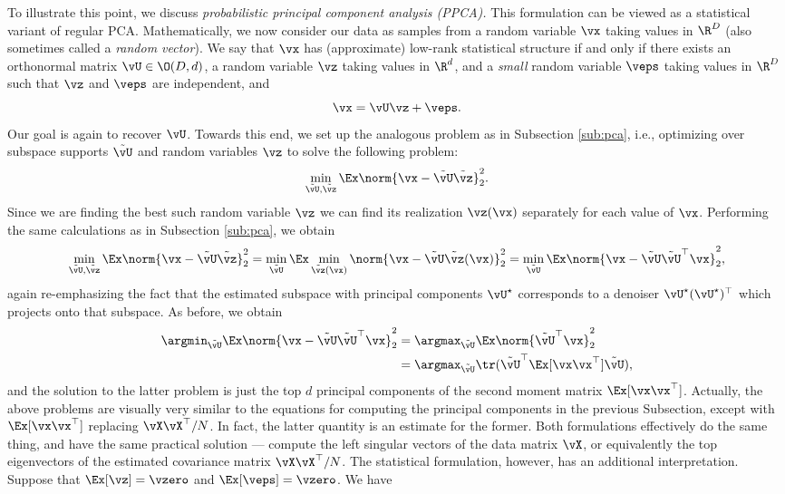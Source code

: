 \documentclass[../../book-main.tex]{subfiles}
\begin{document}
To illustrate this point, we discuss \textit{probabilistic principal component analysis (PPCA).} This formulation can be viewed as a statistical variant of regular PCA. Mathematically, we now consider our data as samples from a random variable \(\vx\) taking values in \(\R^{D}\) (also sometimes called a \textit{random vector}). We say that \(\vx\) has (approximate) low-rank statistical structure if and only if there exists an orthonormal matrix \(\vU \in \O(D, d)\), a random variable \(\vz\) taking values in \(\R^{d}\), and a \textit{small} random variable \(\veps\) taking values in \(\R^{D}\) such that \(\vz\) and \(\veps\) are independent, and
\begin{equation}
    \vx = \vU\vz + \veps.
\end{equation}
Our goal is again to recover \(\vU\). Towards this end, we set up the analogous problem as in Subsection \eqref{sub:pca}, i.e., optimizing over subspace supports \(\tilde{\vU}\) and random variables \(\vz\) to solve the following problem:
\begin{equation}
    \min_{\tilde{\vU}, \tilde{\vz}}\Ex\norm{\vx - \tilde{\vU}\tilde{\vz}}_{2}^{2}.
\end{equation}
Since we are finding the best such random variable \(\vz\) we can find its realization \(\vz(\vx)\) separately for each value of \(\vx\). Performing the same calculations as in Subsection \eqref{sub:pca}, we obtain %
\begin{equation}\label{eq:ppca_denoising}
    \min_{\tilde{\vU}, \tilde{\vz}}\Ex\norm{\vx - \tilde{\vU}\tilde{\vz}}_{2}^{2} = \min_{\tilde{\vU}}\Ex\min_{\tilde{\vz}(\vx)}\norm{\vx - \tilde{\vU}\tilde{\vz}(\vx)}_{2}^{2} = \min_{\tilde{\vU}}\Ex\norm{\vx - \tilde{\vU}\tilde{\vU}^{\top}\vx}_{2}^{2},
\end{equation}
again re-emphasizing the fact that the estimated subspace with principal components \(\vU^{\star}\) corresponds to a denoiser \(\vU^{\star}(\vU^{\star})^{\top}\) which projects onto that subspace. As before, we obtain 
\begin{align}\label{eq:PPCA}
    \argmin_{\tilde{\vU}}\Ex\norm{\vx - \tilde{\vU}\tilde{\vU}^{\top}\vx}_{2}^{2} 
    &= \argmax_{\tilde{\vU}}\Ex\norm{\tilde{\vU}^{\top}\vx}_{2}^{2} \\
    &= \argmax_{\tilde{\vU}}\tr(\tilde{\vU}^{\top}\Ex[\vx\vx^{\top}]\tilde{\vU}),
\end{align}
and the solution to the latter problem is just the top \(d\) principal components of the second moment matrix \(\Ex[\vx\vx^{\top}]\). Actually, the above problems are visually very similar to the equations for computing the principal components in the previous Subsection, except with \(\Ex[\vx\vx^{\top}]\) replacing \(\vX\vX^{\top}/N\). In fact, the latter quantity is an estimate for the former. Both formulations effectively do the same thing, and have the same practical solution --- compute the left singular vectors of the data matrix \(\vX\), or equivalently the top eigenvectors of the estimated covariance matrix \(\vX\vX^{\top}/N\). The statistical formulation, however, has an additional interpretation. Suppose that \(\Ex[\vz] = \vzero\) and \(\Ex[\veps] = \vzero\). We have
\end{document}
